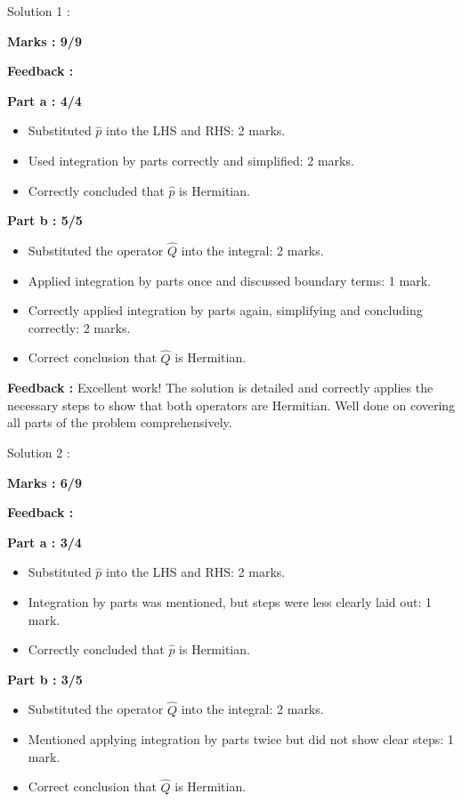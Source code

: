\documentclass[a4paper,11pt]{article}
\begin{document}
Solution 1 :

\textbf{Marks : 9/9}

\textbf{Feedback :}

\textbf{Part a : 4/4}

\begin{itemize}
    \item Substituted $\hat{p}$ into the LHS and RHS: 2 marks.
    \item Used integration by parts correctly and simplified: 2 marks.
    \item Correctly concluded that $\hat{p}$ is Hermitian.
\end{itemize}


\textbf{Part b : 5/5}

\begin{itemize}
    \item Substituted the operator $\hat{Q}$ into the integral: 2 marks.
    \item Applied integration by parts once and discussed boundary terms: 1 mark.
    \item Correctly applied integration by parts again, simplifying and concluding correctly: 2 marks.
    \item Correct conclusion that $\hat{Q}$ is Hermitian.
\end{itemize}

\textbf{Feedback :}
Excellent work! The solution is detailed and correctly applies the necessary steps to show that both operators are Hermitian. Well done on covering all parts of the problem comprehensively.




Solution 2 :

\textbf{Marks : 6/9}

\textbf{Feedback :}

\textbf{Part a : 3/4}

\begin{itemize}
    \item Substituted $\hat{p}$ into the LHS and RHS: 2 marks.
    \item Integration by parts was mentioned, but steps were less clearly laid out: 1 mark.
    \item Correctly concluded that $\hat{p}$ is Hermitian.
\end{itemize}


\textbf{Part b : 3/5}

\begin{itemize}
    \item Substituted the operator $\hat{Q}$ into the integral: 2 marks.
    \item Mentioned applying integration by parts twice but did not show clear steps: 1 mark.
    \item Correct conclusion that $\hat{Q}$ is Hermitian.
\end{itemize}
\end{document}
